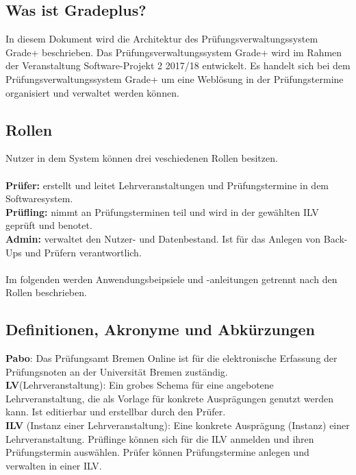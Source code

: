 \subsection{Was ist Gradeplus?} %
In diesem Dokument wird die Architektur des Prüfungsverwaltungssystem \glqq{}Grade+\grqq{} 
beschrieben. Das Prüfungsverwaltungssystem \glqq{}Grade+\grqq{}  wird im Rahmen der Veranstaltung Software-Projekt 2 2017/18 entwickelt. Es handelt sich bei dem Prüfungsverwaltungssystem \glqq{}Grade+\grqq{}  um eine Weblösung in der Prüfungstermine organisiert und verwaltet werden können. 

\subsection{Rollen}
Nutzer in dem System können drei veschiedenen Rollen besitzen.\\
\\
\textbf{Prüfer:} erstellt und leitet Lehrveranstaltungen und Prüfungstermine in dem Softwaresystem. \\ 
\textbf{Prüfling:} nimmt an Prüfungsterminen teil und wird in der gewählten ILV geprüft und benotet. \\ 
\textbf{Admin:} verwaltet den Nutzer- und Datenbestand. Ist für das Anlegen von Back-Ups und Prüfern verantwortlich. \\
\\
Im folgenden werden Anwendungsbeipsiele und -anleitungen getrennt nach den Rollen beschrieben.

\subsection{Definitionen, Akronyme und Abkürzungen}
\textbf{Pabo}:  Das Prüfungsamt Bremen Online ist für die elektronische Erfassung der Prüfungsnoten an der Universität Bremen zuständig.\\
\textbf{LV}(Lehrveranstaltung): Ein grobes Schema für eine angebotene Lehrveranstaltung, die als Vorlage für konkrete Ausprägungen genutzt werden kann. Ist editierbar und erstellbar durch den Prüfer. \\
\textbf{ILV} (Instanz einer Lehrveranstaltung): Eine konkrete Ausprägung (Instanz) einer Lehrveranstaltung. Prüflinge können sich für die ILV anmelden und ihren Prüfungstermin auswählen. Prüfer können Prüfungstermine anlegen und verwalten in einer ILV. \\

